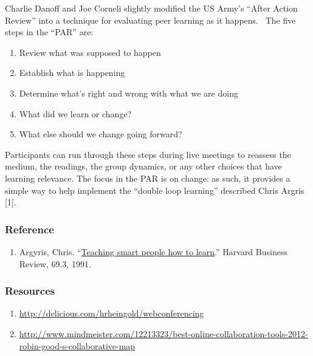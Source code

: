 Charlie Danoff and Joe Corneli slightly modified the US Army's ``After
Action Review'' into a technique for evaluating peer learning as it
happens.~ The five steps in the ``PAR'' are:

\begin{enumerate}
\def\labelenumi{\arabic{enumi}.}
\item
  Review what was supposed to happen
\item
  Establish what is happening
\item
  Determine what's right and wrong with what we are doing
\item
  What did we learn or change?
\item
  What else should we change going forward?
\end{enumerate}

Participants can run through these steps during live meetings to
reassess the medium, the readings, the group dynamics, or any other
choices that have learning relevance. The focus in the PAR is on change:
as such, it provides a simple way to help implement the ``double loop
learning'' described Chris Argris {{[}1{]}}.

\subsubsection{Reference}\label{realtime-reference}

\begin{enumerate}
\def\labelenumi{\arabic{enumi}.}
\itemsep1pt\parskip0pt
\item
  Argyris, Chris.
  ``\href{http://pds8.egloos.com/pds/200805/20/87/chris_argyris_learning.pdf}{Teaching
  smart people how to learn}.'' Harvard Business Review, 69.3, 1991.
\end{enumerate}

\subsubsection{Resources}\label{realtime-resources}

\begin{enumerate}
\def\labelenumi{\arabic{enumi}.}
\item
  {\url{http://delicious.com/hrheingold/webconferencing}}
\item
  {\url{http://www.mindmeister.com/12213323/best-online-collaboration-tools-2012-robin-good-s-collaborative-map}}
\end{enumerate}
